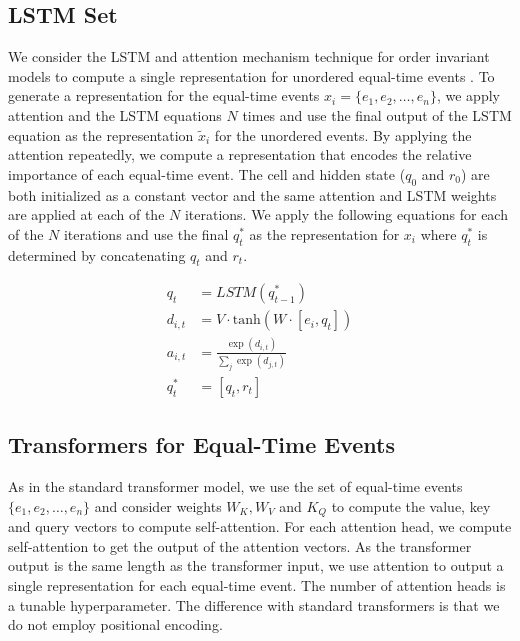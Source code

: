 \documentclass[reqno ,11pt]{article}
\begin{document}
\subsection{LSTM Set} 
We consider the LSTM and attention mechanism technique for order invariant models to compute a single representation for unordered equal-time events \cite{order-matters}. To generate a representation for the equal-time events $x_i = \{e_1, e_2, \dots, e_n\}$, we apply attention and the LSTM equations $N$ times and use the final output of the LSTM equation as the representation $\tilde{x}_i$ for the unordered events. By applying the attention repeatedly, we compute a representation that encodes the relative importance of each equal-time event. The cell and hidden state ($q_0$ and $r_0$) are both initialized as a constant vector and the same attention and LSTM weights are applied at each of the $N$ iterations. We apply the following equations for each of the $N$ iterations and use the final $q_t^*$ as the representation for $x_i$ where $q_t^*$ is determined by concatenating $q_t$ and $r_t$. 

\begin{equation}
\begin{aligned}\label{eq:1}
q_t &= LSTM(q_{t-1}^*)\\ 
d_{i,t} &= V\cdot \text{tanh}(W\cdot [e_i, q_t])\\ 
a_{i,t} &= \frac{\exp(d_{i,t})}{\sum_j \exp(d_{j,t})} \\ 
q_t^* &= [q_t, r_t]
\end{aligned}
\end{equation}

\subsection{Transformers for Equal-Time Events}
As in the standard transformer model, we use the set of equal-time events $ \{e_1, e_2, \dots, e_n\}$ and consider weights $W_K, W_V$ and $K_Q$ to compute the value, key and query vectors to compute self-attention. For each attention head, we compute self-attention to get the output of the attention vectors. As the transformer output is the same length as the transformer input, we use attention to output a single representation for each equal-time event. The number of attention heads is a tunable hyperparameter. The difference with standard transformers is that we do not employ positional encoding. 
\end{document}
